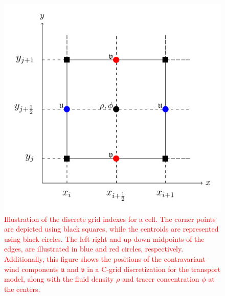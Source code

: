 \documentclass[preprint,12pt]{elsarticle}
\begin{document}
\begin{linenumbers}
\begin{figure}[!htb]
	\centering
	\includegraphics[width=0.5\linewidth]{fv_grid}
	\caption{
	\textcolor{red}{
	Illustration of the discrete grid indexes for a cell. 
	The corner points are depicted using black squares, while the centroids are represented using black circles. 
	The  left-right and up-down midpoints of the edges,  are illustrated in blue and red circles, respectively.
Additionally, this figure shows the positions of the contravariant wind components $\mathfrak{u}$ and $\mathfrak{v}$ in a C-grid discretization for the transport model, along with the fluid density $\rho$ and tracer concentration $\phi$ at the centers.}
	\label{cgrid}}
\end{figure}


\end{linenumbers}
\end{document}
